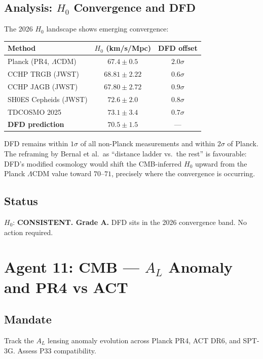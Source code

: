 \documentclass[11pt,a4paper]{article}
\begin{document}
\subsection{Analysis: $H_0$ Convergence and DFD}

The 2026 $H_0$ landscape shows emerging convergence:
\begin{center}
\begin{tabular}{lcc}
\toprule
\textbf{Method} & \textbf{$H_0$ (km/s/Mpc)} & \textbf{DFD offset} \\
\midrule
Planck (PR4, $\Lambda$CDM) & $67.4 \pm 0.5$ & $2.0\sigma$ \\
CCHP TRGB (JWST) & $68.81 \pm 2.22$ & $0.6\sigma$ \\
CCHP JAGB (JWST) & $67.80 \pm 2.72$ & $0.9\sigma$ \\
SH0ES Cepheids (JWST) & $72.6 \pm 2.0$ & $0.8\sigma$ \\
TDCOSMO 2025 & $73.1 \pm 3.4$ & $0.7\sigma$ \\
\textbf{DFD prediction} & $\mathbf{70.5 \pm 1.5}$ & --- \\
\bottomrule
\end{tabular}
\end{center}

DFD remains within $1\sigma$ of all non-Planck measurements and within $2\sigma$ of Planck. The reframing by Bernal et al.\ as ``distance ladder vs.\ the rest'' is favourable: DFD's modified cosmology would shift the CMB-inferred $H_0$ upward from the Planck $\Lambda$CDM value toward $70$--$71$, precisely where the convergence is occurring.

\subsection{Status}
$H_0$: \textbf{CONSISTENT. Grade A.} DFD sits in the 2026 convergence band. No action required.

\section{Agent 11: CMB --- $A_L$ Anomaly and PR4 vs ACT}

\subsection{Mandate}
Track the $A_L$ lensing anomaly evolution across Planck PR4, ACT DR6, and SPT-3G. Assess P33 compatibility.
\end{document}
